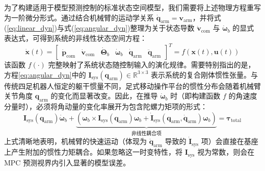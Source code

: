 为了构建适用于模型预测控制的标准状态空间模型\cite{kalman1960new}，我们需要将上述物理方程重写为一阶微分形式。通过结合机械臂的运动学关系 $\dot{\mathbf{q}}_{\text{arm}} = \mathbf{v}_{\text{arm}}$，并将式(\ref{eq:linear_dyn})与式(\ref{eq:angular_dyn})整理为关于状态导数 $\dot{\mathbf{v}}_{\text{com}}$ 与 $\dot{\boldsymbol{\omega}}_b$ 的显式表达式，可得到系统的非线性状态空间方程：
\begin{equation}
    \dot{\mathbf{x}}(t) =
    \begin{bmatrix}
        \dot{\mathbf{p}}_{\text{com}} & \dot{\mathbf{v}}_{\text{com}} & \dot{\boldsymbol{\Theta}}_b & \dot{\boldsymbol{\omega}}_b & \dot{\mathbf{q}}_{\text{arm}} & \ddot{\mathbf{q}}_{\text{arm}}
    \end{bmatrix}^T
    = f(\mathbf{x}(t), \mathbf{u}(t))
    \label{eq:state_space_func}
\end{equation}
该函数 $f(\cdot)$ 完整映射了系统状态随控制输入的演化规律。需要特别指出的是，方程\eqref{eq:angular_dyn}中的 $\mathbf{I}_{\text{sys}}(\mathbf{q}_{\text{arm}}) \in \mathbb{R}^{3 \times 3}$ 表示系统的复合刚体惯性张量。与传统四足机器人恒定的躯干惯量不同，足式移动操作平台的惯性分布会随着机械臂关节角度 $\mathbf{q}_{\text{arm}}$ 的变化而显著改变。因此，在推导 $\dot{\boldsymbol{\omega}}_b$ 时（即构建函数 $f$ 的角速度分量时），必须将角动量的变化率展开为包含陀螺力矩项的形式：
\begin{equation}
    \mathbf{I}_{\text{sys}}(\mathbf{q}_{\text{arm}}) \dot{\boldsymbol{\omega}}_b + \underbrace{\left( \boldsymbol{\omega}_b \times \mathbf{I}_{\text{sys}}(\mathbf{q}_{\text{arm}}) \boldsymbol{\omega}_b + \dot{\mathbf{I}}_{\text{sys}}(\mathbf{q}_{\text{arm}}, \dot{\mathbf{q}}_{\text{arm}}) \boldsymbol{\omega}_b \right)}_{\text{非线性耦合项}} = \boldsymbol{\tau}_{\text{total}}
\end{equation}
上式清晰地表明，机械臂的快速运动（体现为 $\dot{\mathbf{q}}_{\text{arm}}$ 导致的 $\dot{\mathbf{I}}_{\text{sys}}$ 项）会直接在基座上产生附加的惯性力矩耦合。如果忽略这一时变特性，将 $\mathbf{I}_{\text{sys}}$ 视为常数，则会在 MPC 预测视界内引入显著的模型误差。

